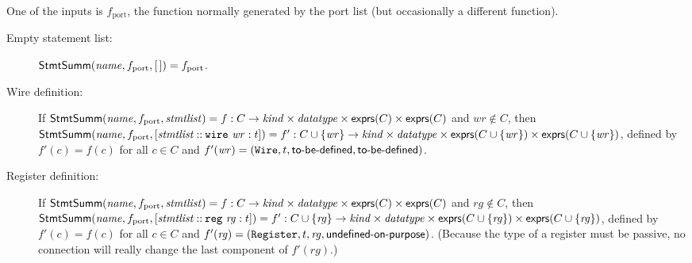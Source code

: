 \documentclass[a4paper]{article}
\newcommand{\stmtsem}{\mathsf{StmtSumm}}
\newcommand{\expressions}{\mathsf{exprs}}
\newcommand{\emptylist}{[\,]}
\newcommand{\rconslist}[2]{[#1 \mathbin{::} #2]}
\newcommand{\needtobedefined}{\text{\textsf{to-be-defined}}}
\newcommand{\undefinedonpurpose}{\text{\textsf{undefined-on-purpose}}}
\begin{document}
One of the inputs is $f_\mathrm{port}$, the function normally generated by the port list (but occasionally a different function).
\begin{description}
\item[Empty statement list:]
	$\stmtsem(\mathit{name}, \linebreak[0] f_\mathrm{port}, \linebreak[0] \emptylist) = f_\mathrm{port}$.

\item[Wire definition:]
	If $\stmtsem(\mathit{name}, \linebreak[0] f_\mathrm{port}, \linebreak[0] \mathit{stmtlist}) = f: C \to \mathit{kind} \times \mathit{datatype} \times \expressions(C) \times \expressions(C)$
	and $\mathit{wr} \notin C$,
	then $\stmtsem(\mathit{name}, \linebreak[0] f_\mathrm{port}, \linebreak[0] \rconslist{\mathit{stmtlist}}{\linebreak[0] \mathtt{wire~} \mathit{wr} : t}) = f': C \cup \{ \mathit{wr} \} \to \mathit{kind} \times \mathit{datatype} \times \expressions(C \cup \{ \mathit{wr} \}) \times \expressions(C \cup \{ \mathit{wr} \})$,
	defined by $f'(c) = f(c)$ for all $c \in C$ and $f'(\mathit{wr}) = (\mathtt{Wire}, t, \linebreak[0] \needtobedefined, \linebreak[0] \needtobedefined)$.

\item[Register definition:]
	If $\stmtsem(\mathit{name}, \linebreak[0] f_\mathrm{port}, \linebreak[0] \mathit{stmtlist}) = f: C \to \mathit{kind} \times \mathit{datatype} \times \expressions(C) \times \expressions(C)$
	and $\mathit{rg} \notin C$,
	then $\stmtsem(\mathit{name}, \linebreak[0] f_\mathrm{port}, \linebreak[0] \rconslist{\mathit{stmtlist}}{\linebreak[0] \mathtt{reg~} \mathit{rg} : t}) = f': C \cup \{ \mathit{rg} \} \to \mathit{kind} \times \mathit{datatype} \times \expressions(C \cup \{ \mathit{rg} \}) \times \expressions(C \cup \{ \mathit{rg} \})$,
	defined by $f'(c) = f(c)$ for all $c \in C$ and $f'(\mathit{rg}) = (\mathtt{Register}, t, \mathit{rg}, \undefinedonpurpose)$.
	(Because the type of a register must be passive, no connection will really change the last component of $f'(\mathit{rg})$.)


\end{description}
\end{document}
